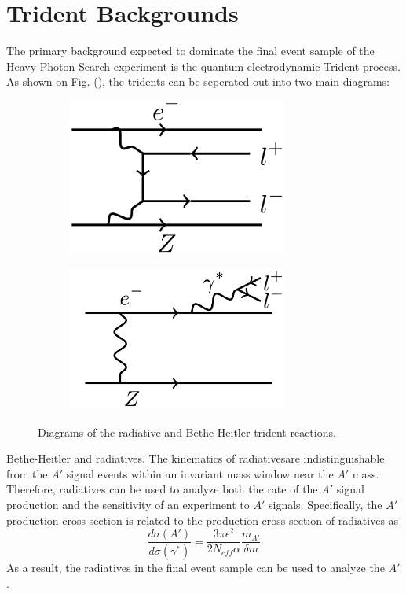\section{Trident Backgrounds}

The primary background expected to dominate the final event sample of the Heavy
Photon Search experiment is the quantum electrodynamic Trident process.  As 
shown on Fig. (\cite{fig:tridents}), the tridents can be seperated out into two
main diagrams: 
\begin{figure}[t]
    \begin{subfigure}{.5\textwidth}
        \centering
        \includegraphics[width=0.8\textwidth]{images/bethe-heitler.png}
    \end{subfigure}
    \begin{subfigure}{.5\textwidth}
        \centering
        \includegraphics[width=0.8\textwidth]{images/radiative.png}
    \end{subfigure}
    \caption{Diagrams of the radiative and Bethe-Heitler trident reactions.}
    \label{fig:tridents}
\end{figure}  
Bethe-Heitler and radiatives. The kinematics of radiativesare indistinguishable
from the $A'$ signal events within an invariant mass window near the $A'$ mass.
Therefore, radiatives can be used to analyze both the rate of the $A'$ signal 
production and the sensitivity of an experiment to $A'$ signals.  Specifically,
the $A'$ production cross-section is related to the production cross-section of 
radiatives as 
\[
    \frac{d\sigma(A')}{d\sigma(\gamma^*)} = \frac{3\pi\epsilon^{2}}{2 N_{eff} \alpha}
        \frac{m_{A'}}{\delta m}
\]
As a result, the radiatives in the final event sample can be used to analyze 
the $A'$.

